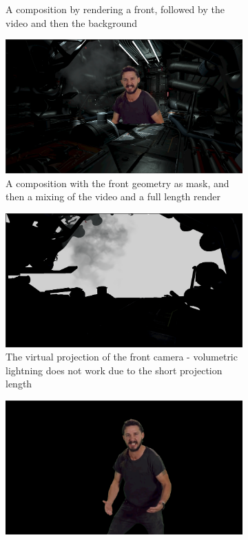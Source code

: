 \begin{figure}[htbp]
\begin{subfigure}[t]{.45\textwidth}
		\caption{A composition by rendering a front, followed by the video and 
		then the background}
	\end{subfigure}
	\begin{subfigure}[t]{.45\textwidth}
		\centering
		\includegraphics[width=\textwidth]{_raw_resources/composition/Composition-Front-Mask.png}
		\caption{A composition with the front geometry as mask, and then a 
		mixing of the video and a full length render}
	\end{subfigure}
	\newline
	\begin{subfigure}[t]{.45\textwidth}
		\centering
		\includegraphics[width=\textwidth]{_raw_resources/composition/Composition-Front.png}
		\caption{The virtual projection of the front camera - volumetric 
		lightning does not work due to the short projection length}
		\label{fig:zsort:comparison:front}
	\end{subfigure}
	\begin{subfigure}[t]{.45\textwidth}
		\centering
		\includegraphics[width=\textwidth]{_raw_resources/composition/Composition-Chroma-Result.png}

\end{subfigure}
\end{figure}
